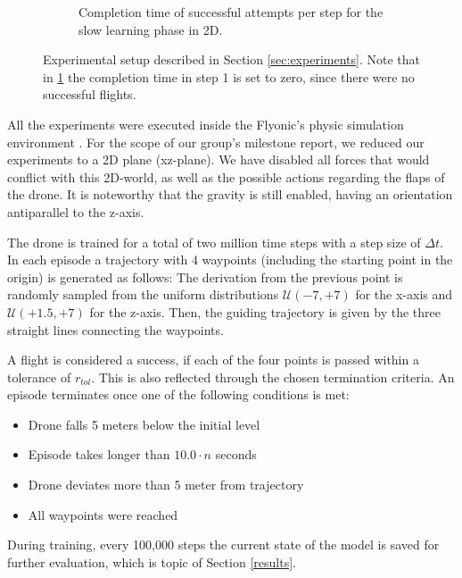 \begin{figure}[t]
\begin{subfigure}[htb!]{0.3\textwidth}
    \caption{Completion time of successful attempts per step for the slow learning phase in 2D.}
    \label{fig:time_slow}
\end{subfigure}
\caption{Experimental setup described in Section \ref{sec:experiments}. Note that in \ref{fig:time_slow} the completion time in step 1 is set to zero, since there were no successful flights.}
\label{fig:results}
\end{figure}
All the experiments were executed inside the Flyonic's physic simulation environment \cite{flyonic}. 
For the scope of our group's milestone report, we reduced our experiments to a 2D plane (xz-plane). We have disabled all forces that would conflict with this 2D-world, as well as the possible actions regarding the flaps of the drone. It is noteworthy that the gravity is still enabled, having an orientation antiparallel to the z-axis.
\par
The drone is trained for a total of two million time steps with a step size of $\Delta t$. 
In each episode a trajectory with 4 waypoints (including the starting point in the origin) is generated as follows:
The derivation from the previous point is randomly sampled from the uniform distributions $\mathcal{U}(-7, +7)$ for the x-axis and $\mathcal{U}(+1.5, +7)$ for the z-axis. Then, the guiding trajectory is given by the three straight lines connecting the waypoints. 
\par
A flight is considered a success, if each of the four points is passed within a tolerance of $r_{tol}$. This is also reflected through the chosen termination criteria. An episode terminates once one of the following conditions is met:
\begin{itemize}
    \item Drone falls 5 meters below the initial level
    \item Episode takes longer than $10.0 \cdot n$ seconds
    \item Drone deviates more than 5 meter from trajectory
    \item All waypoints were reached
\end{itemize}
\par
During training, every 100,000 steps the current state of the model is saved for further evaluation, which is topic of Section \ref{results}.